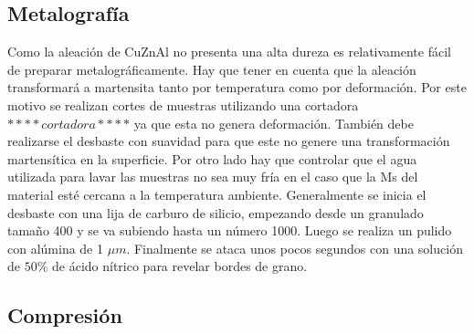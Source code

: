 \documentclass[a4paper,12pt,fleqn,twoside,openany]{book}
\begin{document}
\subsection{Metalografía}

Como la aleación de CuZnAl no presenta una alta dureza es relativamente fácil de preparar metalográficamente. Hay que tener en cuenta que la aleación 
transformará a martensita tanto por temperatura como por deformación. Por este motivo se realizan cortes de muestras utilizando una cortadora 
$****cortadora****$ ya que esta no genera deformación. También debe realizarse el desbaste con suavidad para que este no genere una transformación martensítica 
en la superficie. Por otro lado hay que controlar que el agua utilizada para lavar las muestras no sea muy fría en el caso 
que la Ms del material esté cercana a la temperatura ambiente. 
Generalmente se inicia el desbaste con una lija de carburo de silicio, empezando desde un granulado tamaño 400 y se va subiendo hasta un número 1000. 
Luego se realiza un pulido con alúmina de 1 $\mu m$. Finalmente se ataca unos pocos segundos con una solución de $50 \% $ de ácido nítrico para revelar 
bordes de grano. 

\subsection{Compresión}


\end{document}
